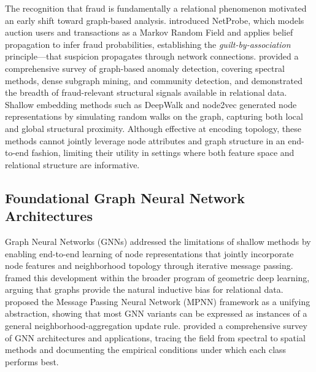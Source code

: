 The recognition that fraud is fundamentally a relational phenomenon motivated an early
shift toward graph-based analysis. \cite{pandit2007netprobe} introduced NetProbe, which
models auction users and transactions as a Markov Random Field and applies belief
propagation to infer fraud probabilities, establishing the \emph{guilt-by-association}
principle—that suspicion propagates through network connections. \cite{akoglu2015graph}
provided a comprehensive survey of graph-based anomaly detection, covering spectral
methods, dense subgraph mining, and community detection, and demonstrated the breadth of
fraud-relevant structural signals available in relational data. Shallow embedding
methods such as DeepWalk \cite{perozzi2014deepwalk} and node2vec \cite{grover2016node2vec}
generated node representations by simulating random walks on the graph, capturing both
local and global structural proximity. Although effective at encoding topology, these
methods cannot jointly leverage node attributes and graph structure in an end-to-end
fashion, limiting their utility in settings where both feature space and relational
structure are informative.

\subsection{Foundational Graph Neural Network Architectures}

Graph Neural Networks (GNNs) addressed the limitations of shallow methods by enabling
end-to-end learning of node representations that jointly incorporate node features and
neighborhood topology through iterative message passing. \cite{bronstein2017geometric}
framed this development within the broader program of geometric deep learning, arguing
that graphs provide the natural inductive bias for relational data. \cite{gilmer2017neural}
proposed the Message Passing Neural Network (MPNN) framework as a unifying abstraction,
showing that most GNN variants can be expressed as instances of a general
neighborhood-aggregation update rule. \cite{wu2021graph} provided a comprehensive
survey of GNN architectures and applications, tracing the field from spectral to spatial
methods and documenting the empirical conditions under which each class performs best.

